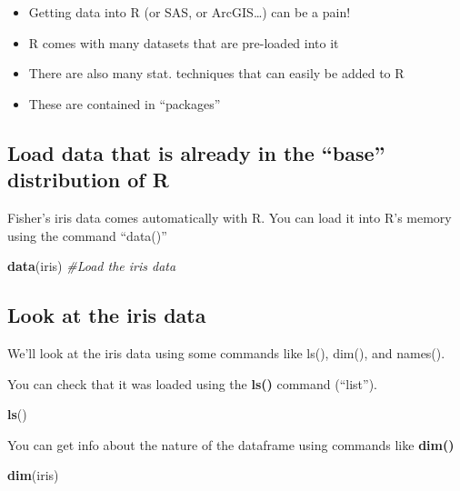 \documentclass[]{book}
\newenvironment{Shaded}{\begin{snugshade}}{\end{snugshade}}
\newcommand{\KeywordTok}[1]{\textcolor[rgb]{0.13,0.29,0.53}{\textbf{#1}}}
\newcommand{\CommentTok}[1]{\textcolor[rgb]{0.56,0.35,0.01}{\textit{#1}}}
\newcommand{\NormalTok}[1]{#1}
\providecommand{\tightlist}{%
  \setlength{\itemsep}{0pt}\setlength{\parskip}{0pt}}
\theoremstyle{definition}
\theoremstyle{definition}
\theoremstyle{definition}
\theoremstyle{remark}
\begin{document}
\begin{itemize}
\tightlist
\item
  Getting data into R (or SAS, or ArcGIS\ldots{}) can be a pain!
\item
  R comes with many datasets that are pre-loaded into it
\item
  There are also many stat. techniques that can easily be added to R
\item
  These are contained in ``packages''
\end{itemize}

\subsection{\texorpdfstring{Load data that is already in the ``base''
distribution of
R}{Load data that is already in the base distribution of R}}\label{load-data-that-is-already-in-the-base-distribution-of-r}

Fisher's iris data comes automatically with R. You can load it into R's
memory using the command ``data()''

\begin{Shaded}
\begin{Highlighting}[]
\KeywordTok{data}\NormalTok{(iris) }\CommentTok{#Load the iris data}
\end{Highlighting}
\end{Shaded}

\subsection{Look at the iris data}\label{look-at-the-iris-data}

We'll look at the iris data using some commands like ls(), dim(), and
names().

You can check that it was loaded using the \textbf{ls()} command
(``list'').

\begin{Shaded}
\begin{Highlighting}[]
\KeywordTok{ls}\NormalTok{()}
\end{Highlighting}
\end{Shaded}

You can get info about the nature of the dataframe using commands like
\textbf{dim()}

\begin{Shaded}
\begin{Highlighting}[]
\KeywordTok{dim}\NormalTok{(iris)}
\end{Highlighting}
\end{Shaded}
\end{document}
